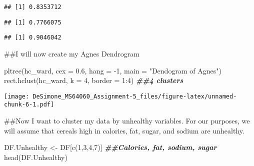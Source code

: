 \documentclass[
]{article}
\newenvironment{Shaded}{\begin{snugshade}}{\end{snugshade}}
\newcommand{\AttributeTok}[1]{\textcolor[rgb]{0.77,0.63,0.00}{#1}}
\newcommand{\DecValTok}[1]{\textcolor[rgb]{0.00,0.00,0.81}{#1}}
\newcommand{\DocumentationTok}[1]{\textcolor[rgb]{0.56,0.35,0.01}{\textbf{\textit{#1}}}}
\newcommand{\FloatTok}[1]{\textcolor[rgb]{0.00,0.00,0.81}{#1}}
\newcommand{\FunctionTok}[1]{\textcolor[rgb]{0.00,0.00,0.00}{#1}}
\newcommand{\NormalTok}[1]{#1}
\newcommand{\OtherTok}[1]{\textcolor[rgb]{0.56,0.35,0.01}{#1}}
\newcommand{\SpecialCharTok}[1]{\textcolor[rgb]{0.00,0.00,0.00}{#1}}
\newcommand{\StringTok}[1]{\textcolor[rgb]{0.31,0.60,0.02}{#1}}
\begin{document}
\begin{verbatim}
## [1] 0.8353712
\end{verbatim}

\begin{Shaded}
\end{Shaded}

\begin{verbatim}
## [1] 0.7766075
\end{verbatim}

\begin{Shaded}
\end{Shaded}

\begin{verbatim}
## [1] 0.9046042
\end{verbatim}

\#\#I will now create my Agnes Dendrogram

\begin{Shaded}
\begin{Highlighting}[]
\FunctionTok{pltree}\NormalTok{(hc\_ward, }\AttributeTok{cex =} \FloatTok{0.6}\NormalTok{, }\AttributeTok{hang =} \SpecialCharTok{{-}}\DecValTok{1}\NormalTok{, }\AttributeTok{main =} \StringTok{"Dendogram of Agnes"}\NormalTok{)}
\FunctionTok{rect.hclust}\NormalTok{(hc\_ward, }\AttributeTok{k =} \DecValTok{4}\NormalTok{, }\AttributeTok{border =} \DecValTok{1}\SpecialCharTok{:}\DecValTok{4}\NormalTok{) }\DocumentationTok{\#\#4 clusters}
\end{Highlighting}
\end{Shaded}

\texttt{[image: DeSimone\_MS64060\_Assignment-5\_files/figure-latex/unnamed-chunk-6-1.pdf]}

\#\#Now I want to cluster my data by unhealthy variables. For our
purposes, we will assume that cereals high in calories, fat, sugar, and
sodium are unhealthy.

\begin{Shaded}
\begin{Highlighting}[]
\NormalTok{DF.Unhealthy }\OtherTok{\textless{}{-}}\NormalTok{ DF[}\FunctionTok{c}\NormalTok{(}\DecValTok{1}\NormalTok{,}\DecValTok{3}\NormalTok{,}\DecValTok{4}\NormalTok{,}\DecValTok{7}\NormalTok{)] }\DocumentationTok{\#\#Calories, fat, sodium, sugar}
\FunctionTok{head}\NormalTok{(DF.Unhealthy)}
\end{Highlighting}
\end{Shaded}
\end{document}
